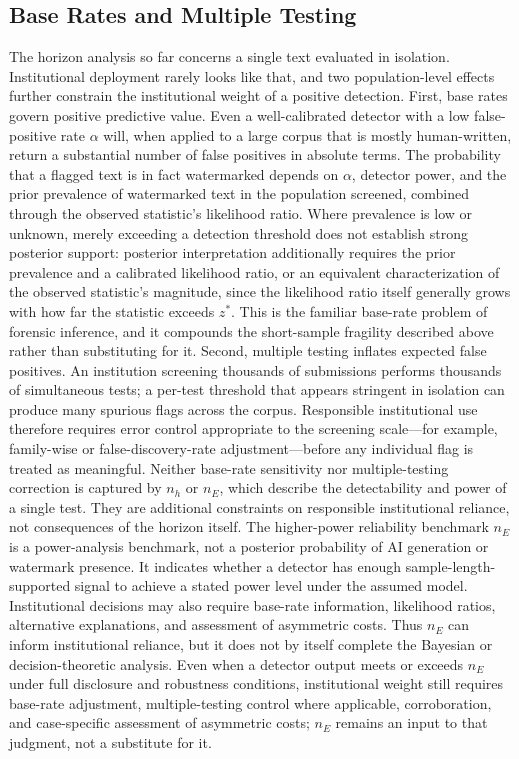 \documentclass[11pt]{article}
\begin{document}
\subsection{Base Rates and Multiple Testing}
The horizon analysis so far concerns a single text evaluated in isolation.
Institutional deployment rarely looks like that, and two population-level effects
further constrain the institutional weight of a positive detection.
First, base rates govern positive predictive value. Even a well-calibrated detector
with a low false-positive rate $\alpha$ will, when applied to a large corpus that is
mostly human-written, return a substantial number of false positives in absolute
terms. The probability that a flagged text is in fact watermarked depends on
$\alpha$, detector power, and the prior prevalence of watermarked text in the
population screened, combined through the observed statistic's likelihood ratio.
Where prevalence is low or unknown, merely exceeding a detection threshold does not
establish strong posterior support: posterior interpretation additionally requires
the prior prevalence and a calibrated likelihood ratio, or an equivalent
characterization of the observed statistic's magnitude, since the likelihood ratio
itself generally grows with how far the statistic exceeds $z^*$. This is the
familiar base-rate problem of forensic inference, and it compounds the short-sample
fragility described above rather than substituting for it.
Second, multiple testing inflates expected false positives. An institution screening
thousands of submissions performs thousands of simultaneous tests; a per-test
threshold that appears stringent in isolation can produce many spurious flags across
the corpus. Responsible institutional use therefore requires error control
appropriate to the screening scale---for example, family-wise or
false-discovery-rate adjustment---before any individual flag is treated as
meaningful. Neither base-rate sensitivity nor multiple-testing correction is captured
by $n_h$ or $n_E$, which describe the detectability and power of a single test. They
are additional constraints on responsible institutional reliance, not consequences of
the horizon itself.
The higher-power reliability benchmark $n_E$ is a power-analysis benchmark, not a
posterior probability of AI generation or watermark presence. It indicates whether a
detector has enough sample-length-supported signal to achieve a stated power level
under the assumed model. Institutional decisions may also require base-rate
information, likelihood ratios, alternative explanations, and assessment of
asymmetric costs. Thus $n_E$ can inform institutional reliance, but it does not by
itself complete the Bayesian or decision-theoretic analysis. Even when a detector
output meets or exceeds $n_E$ under full disclosure and robustness conditions,
institutional weight still requires base-rate adjustment, multiple-testing control
where applicable, corroboration, and case-specific assessment of asymmetric costs;
$n_E$ remains an input to that judgment, not a substitute for it.
\end{document}
